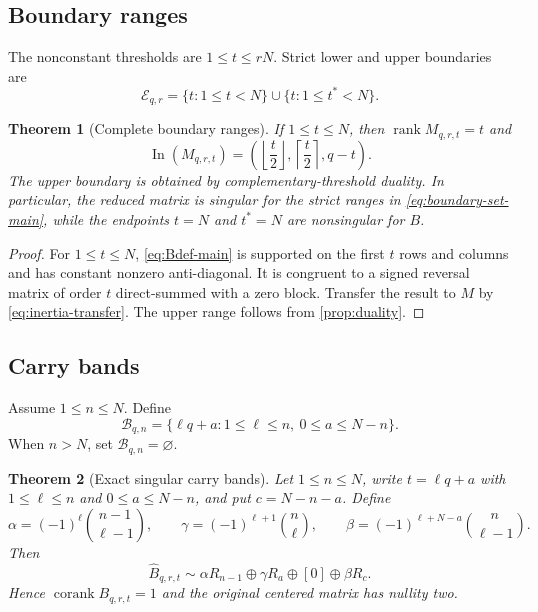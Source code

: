 \documentclass[11pt]{amsart}
\newcommand{\cB}{\widehat B}
\newcommand{\In}{\operatorname{In}}
\newcommand{\rank}{\operatorname{rank}}
\newcommand{\corank}{\operatorname{corank}}
\newcommand{\Bands}{\mathcal B}
\newcommand{\1}{\mathbf 1}
\newtheorem{theorem}{Theorem}[section]
\theoremstyle{remark}
\begin{document}
\subsection{Boundary ranges}
The nonconstant thresholds are $1\le t\le rN$. Strict lower and upper boundaries are
\begin{equation}\label{eq:boundary-set-main}
 \mathcal E_{q,r}=\{t:1\le t<N\}\cup\{t:1\le t^*<N\}.
\end{equation}

\begin{theorem}[Complete boundary ranges]\label{thm:boundary}
If $1\le t\le N$, then $\rank M_{q,r,t}=t$ and
\[
 \In(M_{q,r,t})=\left(\left\lfloor\frac t2\right\rfloor,
 \left\lceil\frac t2\right\rceil,q-t\right).
\]
The upper boundary is obtained by complementary-threshold duality. In particular, the reduced matrix is singular for the strict ranges in \eqref{eq:boundary-set-main}, while the endpoints $t=N$ and $t^*=N$ are nonsingular for $B$.
\end{theorem}

\begin{proof}
For $1\le t\le N$, \eqref{eq:Bdef-main} is supported on the first $t$ rows and columns and has constant nonzero anti-diagonal. It is congruent to a signed reversal matrix of order $t$ direct-summed with a zero block. Transfer the result to $M$ by \eqref{eq:inertia-transfer}. The upper range follows from \cref{prop:duality}.
\end{proof}

\subsection{Carry bands}
Assume $1\le n\le N$. Define
\begin{equation}\label{eq:band-set-main}
 \Bands_{q,n}=\{\ell q+a:1\le\ell\le n,\ 0\le a\le N-n\}.
\end{equation}
When $n>N$, set $\Bands_{q,n}=\varnothing$.

\begin{theorem}[Exact singular carry bands]\label{thm:bands}
Let $1\le n\le N$, write $t=\ell q+a$ with $1\le\ell\le n$ and $0\le a\le N-n$, and put $c=N-n-a$. Define
\[
 \alpha=(-1)^\ell\binom{n-1}{\ell-1},\qquad
 \gamma=(-1)^{\ell+1}\binom n\ell,\qquad
 \beta=(-1)^{\ell+N-a}\binom n{\ell-1}.
\]
Then
\begin{equation}\label{eq:band-congruence}
 \cB_{q,r,t}\sim \alpha R_{n-1}\oplus\gamma R_a\oplus[0]\oplus\beta R_c.
\end{equation}
Hence $\corank B_{q,r,t}=1$ and the original centered matrix has nullity two.
\end{theorem}
\end{document}
